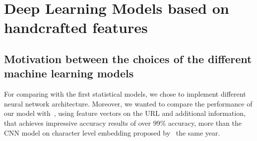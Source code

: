 \documentclass{article}
\begin{document}


    \section{Deep Learning Models based on handcrafted features}\label{sec:deep-learning-models}

    \subsection{Motivation between the choices of the different machine learning models}\label{subsec:motivation-between-the-choices-of-the-different-machine-learning-models}
    For comparing with the first statistical models, we chose to implement different neural network architecture.
    Moreover, we wanted to compare the performance of our model with~\cite{EfficientDeepLearningPhishingDetection}, using feature vectors on the URL and additional information, that achieves impressive accuracy results of over 99\% accuracy, more than the CNN model on character level embedding proposed by~\cite{CharacterLevelCNN} the same year.
\end{document}
